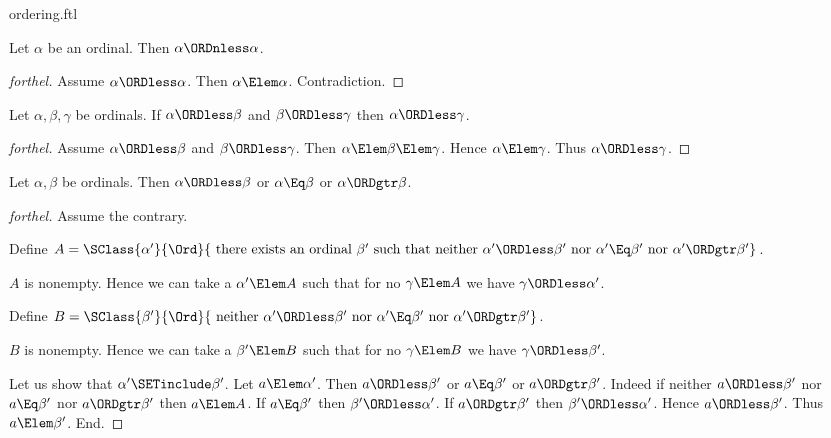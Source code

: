 \documentclass{stex}
\begin{document}
\begin{smodule}{ordering.ftl}
\begin{proposition}[forthel,id=SET_THEORY_02_6229364135952384]
  Let $\alpha$ be an ordinal.
  Then $\alpha \ORDnless \alpha$.
\end{proposition}
\begin{proof}[forthel]
  Assume $\alpha \ORDless \alpha$.
  Then $\alpha \Elem \alpha$.
  Contradiction.
\end{proof}

\begin{proposition}[forthel,id=SET_THEORY_02_7098683017396224]
  Let $\alpha, \beta, \gamma$ be ordinals.
  If $\alpha \ORDless \beta$ and $\beta \ORDless \gamma$ then $\alpha \ORDless \gamma$.
\end{proposition}
\begin{proof}[forthel]
  Assume $\alpha \ORDless \beta$ and $\beta \ORDless \gamma$.
  Then $\alpha \Elem \beta \Elem \gamma$.
  Hence $\alpha \Elem \gamma$.
  Thus $\alpha \ORDless \gamma$.
\end{proof}

\begin{proposition}[forthel,id=SET_THEORY_02_1718825707896832]
  Let $\alpha, \beta$ be ordinals.
  Then $\alpha \ORDless \beta$ or $\alpha \Eq \beta$ or $\alpha \ORDgtr \beta$.
\end{proposition}
\begin{proof}[forthel]
  Assume the contrary.
  
  Define $A = \SClass{\alpha'}{\Ord}{\text{ there exists an ordinal }\beta'\text{ such that neither }\alpha' \ORDless \beta'\text{ nor }\alpha' \Eq \beta'\text{ nor }\alpha' \ORDgtr \beta'}$.
  
  $A$ is nonempty.
  Hence we can take a $\alpha' \Elem A$ such that for no $\gamma \Elem A$ we have $\gamma \ORDless \alpha'$.
  
  Define $B = \SClass{\beta'}{\Ord}{\text{ neither }\alpha' \ORDless \beta'\text{ nor }\alpha' \Eq \beta'\text{ nor }\alpha' \ORDgtr \beta'}$.
  
  $B$ is nonempty.
  Hence we can take a $\beta' \Elem B$ such that for no $\gamma \Elem B$ we have $\gamma \ORDless \beta'$.

  Let us show that $\alpha' \SETinclude \beta'$.
    Let $a \Elem \alpha'$.
    Then $a \ORDless \beta'$ or $a \Eq \beta'$ or $a \ORDgtr \beta'$.
    Indeed if neither $a \ORDless \beta'$ nor $a \Eq \beta'$ nor $a \ORDgtr \beta'$ then
    $a \Elem A$.
    If $a \Eq \beta'$ then $\beta' \ORDless \alpha'$.
    If $a \ORDgtr \beta'$ then $\beta' \ORDless \alpha'$.
    Hence $a \ORDless \beta'$.
    Thus $a \Elem \beta'$.
  End.


\end{proof}
\end{smodule}
\end{document}
